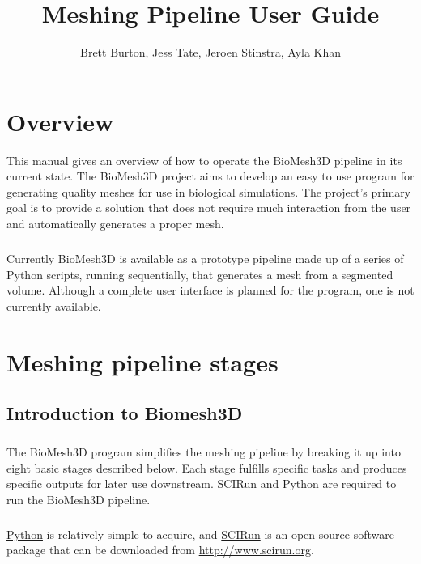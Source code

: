 \documentclass[fleqn,12pt,openany]{book}
\title{Meshing Pipeline User Guide}
\author{Brett Burton, Jess Tate, Jeroen Stinstra, Ayla Khan}
\begin{document}
\maketitle


\chapter{Overview}\label{overview}

This manual gives an overview of how to operate the BioMesh3D pipeline in its
current state. The BioMesh3D project aims to develop an easy to use 
program for generating quality meshes for use in biological simulations.
The project's primary goal is to provide a solution that does not require much interaction from the
user and automatically generates a proper mesh.
\paragraph{}
Currently BioMesh3D is available as a prototype pipeline made up of a series of Python scripts, running sequentially, that generates a mesh from a segmented volume.
Although a complete user interface is planned for the program, one is not currently available.

\chapter{Meshing pipeline stages}
\label{sec:tetgenflags}

\section{Introduction to Biomesh3D}
\label{sec:flags}

\paragraph{}
The BioMesh3D program simplifies the meshing pipeline by breaking it up into 
eight basic stages described below. Each stage fulfills specific tasks and 
produces specific outputs for later use downstream.
SCIRun and Python are required to run the BioMesh3D pipeline.

\paragraph{}
\href{http://www.python.org}{Python} is relatively simple to acquire, and \href{http://www.scirun.org}{SCIRun} is 
an open source software package that can be downloaded from 
\url{http://www.scirun.org}.
\end{document}
